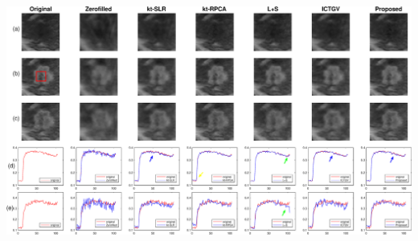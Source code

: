 \documentclass{beamer}
\begin{document}
\begin{frame}
\hspace{-0.9cm}
	\begin{minipage}{1\textwidth}
\centering
\includegraphics[width=1.15\textwidth]{../img/tgvnn/figure6_breast1_frames.eps}
\label{fig:breast1_time}
\end{minipage}
\end{frame}
\end{document}
